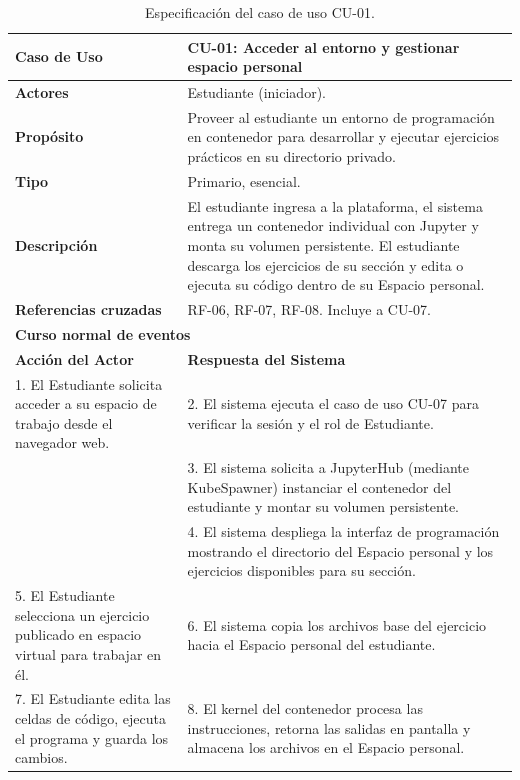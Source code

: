 \begin{table}[H]
\centering
\caption{Especificación del caso de uso CU-01.}
\label{tab:cu_01}
\small
\begin{tabular}{p{} p{}}
\toprule
\textbf{Caso de Uso} & \textbf{CU-01: Acceder al entorno y gestionar espacio personal} \\
\midrule
\textbf{Actores} & Estudiante (iniciador). \\
\textbf{Propósito} & Proveer al estudiante un entorno de programación en contenedor para desarrollar y ejecutar ejercicios prácticos en su directorio privado. \\
\textbf{Tipo} & Primario, esencial. \\
\textbf{Descripción} & El estudiante ingresa a la plataforma, el sistema entrega un contenedor individual con Jupyter y monta su volumen persistente. El estudiante descarga los ejercicios de su sección y edita o ejecuta su código dentro de su Espacio personal. \\
\textbf{Referencias cruzadas} & RF-06, RF-07, RF-08. Incluye a CU-07. \\
\midrule
\multicolumn{2}{l}{\textbf{Curso normal de eventos}} \\
\midrule
\textbf{Acción del Actor} & \textbf{Respuesta del Sistema} \\
\midrule
1. El Estudiante solicita acceder a su espacio de trabajo desde el navegador web. & 2. El sistema ejecuta el caso de uso CU-07 para verificar la sesión y el rol de Estudiante. \\
 & 3. El sistema solicita a JupyterHub (mediante KubeSpawner) instanciar el contenedor del estudiante y montar su volumen persistente. \\
 & 4. El sistema despliega la interfaz de programación mostrando el directorio del Espacio personal y los ejercicios disponibles para su sección. \\
5. El Estudiante selecciona un ejercicio publicado en espacio virtual para trabajar en él. & 6. El sistema copia los archivos base del ejercicio hacia el Espacio personal del estudiante. \\
7. El Estudiante edita las celdas de código, ejecuta el programa y guarda los cambios. & 8. El kernel del contenedor procesa las instrucciones, retorna las salidas en pantalla y almacena los archivos en el Espacio personal. \\
\bottomrule
\end{tabular}
\end{table}

